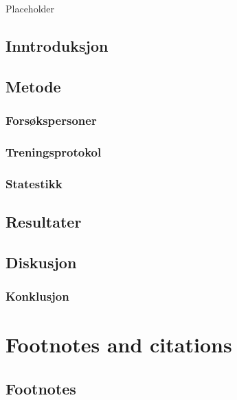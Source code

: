 \documentclass[
]{book}
\begin{document}
Placeholder

\hypertarget{inntroduksjon-1}{%
\section{Inntroduksjon}\label{inntroduksjon-1}}

\hypertarget{metode-2}{%
\section{Metode}\label{metode-2}}

\hypertarget{forsuxf8kspersoner}{%
\subsection{Forsøkspersoner}\label{forsuxf8kspersoner}}

\hypertarget{treningsprotokol}{%
\subsection{Treningsprotokol}\label{treningsprotokol}}

\hypertarget{statestikk}{%
\subsection{Statestikk}\label{statestikk}}

\hypertarget{resultater}{%
\section{Resultater}\label{resultater}}

\hypertarget{diskusjon}{%
\section{Diskusjon}\label{diskusjon}}

\hypertarget{konklusjon}{%
\subsection{Konklusjon}\label{konklusjon}}

\hypertarget{footnotes-and-citations}{%
\chapter{Footnotes and citations}\label{footnotes-and-citations}}

\hypertarget{footnotes}{%
\section{Footnotes}\label{footnotes}}
\end{document}
